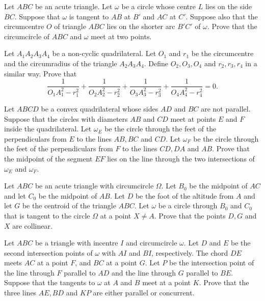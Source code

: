 \item[\textbf{G1.}]
Let 
$ABC$
 be an acute triangle. Let 
$\omega$
 be a circle whose centre 
$L$
 lies on the side 
$BC$.
 Suppose that 
$\omega$
 is tangent to 
$AB$
 at 
$B'$
 and 
$AC$
 at 
$C'$.
 Suppose also that the circumcentre 
$O$
 of triangle 
$ABC$
 lies on the shorter arc 
$B'C'$
 of 
$\omega$.
 Prove that the circumcircle of 
$ABC$
 and 
$\omega$
 meet at two points.

\item[\textbf{G2.}]
Let 
$A_1A_2A_3A_4$
 be a non-cyclic quadrilateral. Let 
$O_1$
 and 
$r_1$
 be the circumcentre and the circumradius of the triangle 
$A_2A_3A_4$.
 Define 
$O_2,O_3,O_4$
 and 
$r_2,r_3,r_4$
 in a similar way. Prove that
\[\frac{1}{O_1A_1^2-r_1^2}+\frac{1}{O_2A_2^2-r_2^2}+\frac{1}{O_3A_3^2-r_3^2}+\frac{1}{O_4A_4^2-r_4^2}=0.\]

\item[\textbf{G3.}]
Let 
$ABCD$
 be a convex quadrilateral whose sides 
$AD$
 and 
$BC$
 are not parallel. Suppose that the circles with diameters 
$AB$
 and 
$CD$
 meet at points 
$E$
 and 
$F$
 inside the quadrilateral. Let 
$\omega_E$
 be the circle through the feet of the perpendiculars from 
$E$
 to the lines 
$AB,BC$
 and 
$CD$.
 Let 
$\omega_F$
 be the circle through  the feet of the perpendiculars from 
$F$
 to the lines 
$CD,DA$
 and 
$AB$.
 Prove that the midpoint of the segment 
$EF$
 lies on the line through the two intersections of 
$\omega_E$
 and 
$\omega_F$.

\item[\textbf{G4.}]
Let 
$ABC$
 be an acute triangle with circumcircle 
$\Omega$.
 Let 
$B_0$
 be the midpoint of 
$AC$
 and let 
$C_0$
 be the midpoint of 
$AB$.
 Let 
$D$
 be the foot of the altitude from 
$A$
 and let 
$G$
 be the centroid of the triangle 
$ABC$.
 Let 
$\omega$
 be a circle through 
$B_0$
 and 
$C_0$
 that is tangent to the circle 
$\Omega$
 at a point 
$X\not= A$.
 Prove that the points 
$D,G$
 and 
$X$
 are collinear.

\item[\textbf{G5.}]
Let 
$ABC$
 be a triangle with incentre 
$I$
 and circumcircle 
$\omega$.
 Let 
$D$
 and 
$E$
 be the second intersection points of 
$\omega$
 with 
$AI$
 and 
$BI$, 
 respectively. The chord 
$DE$
 meets 
$AC$
 at a point 
$F$, 
 and 
$BC$
 at a point 
$G$.
 Let 
$P$
 be the intersection point of the line through 
$F$
 parallel to 
$AD$
 and the line through 
$G$
 parallel to 
$BE$.
 Suppose that the tangents to 
$\omega$
 at 
$A$
 and 
$B$
 meet at a point 
$K$.
 Prove that the three lines 
$AE,BD$
 and 
$KP$
 are either parallel or concurrent.

